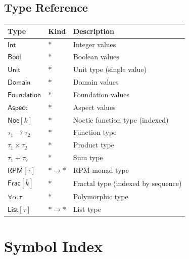 \documentclass[11pt,twoside,openright]{book}
\theoremstyle{definition}
\theoremstyle{plain}
\theoremstyle{remark}
\begin{document}
\section{Type Reference}

\begin{center}
\begin{tabular}{lll}
\toprule
\textbf{Type} & \textbf{Kind} & \textbf{Description} \\
\midrule
$\mathsf{Int}$ & $*$ & Integer values \\
$\mathsf{Bool}$ & $*$ & Boolean values \\
$\mathsf{Unit}$ & $*$ & Unit type (single value) \\
$\mathsf{Domain}$ & $*$ & Domain values \\
$\mathsf{Foundation}$ & $*$ & Foundation values \\
$\mathsf{Aspect}$ & $*$ & Aspect values \\
$\mathsf{Noe}[k]$ & $*$ & Noetic function type (indexed) \\
$\tau_1 \to \tau_2$ & $*$ & Function type \\
$\tau_1 \times \tau_2$ & $*$ & Product type \\
$\tau_1 + \tau_2$ & $*$ & Sum type \\
$\mathsf{RPM}[\tau]$ & $* \to *$ & RPM monad type \\
$\mathsf{Frac}[\bar{k}]$ & $*$ & Fractal type (indexed by sequence) \\
$\forall \alpha. \tau$ & $*$ & Polymorphic type \\
$\mathsf{List}[\tau]$ & $* \to *$ & List type \\
\bottomrule
\end{tabular}
\end{center}

\appendix

\chapter{Symbol Index}
\label{app:symbols}
\end{document}
